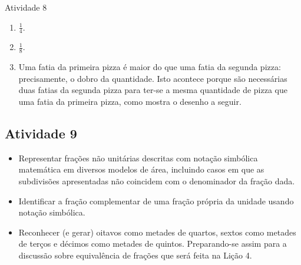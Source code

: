 \begin{multicols}{2}
\begin{resposta*}{Atividade 8}
\begin{enumerate} [\quad a)] %
    \item             $\frac{1}{4}$.
    \item             $\frac{1}{8}$.
    \item       Uma fatia da primeira pizza é maior do que uma fatia da segunda pizza: precisamente, o dobro da quantidade. Isto acontece porque são necessárias duas fatias da segunda pizza para ter-se a mesma quantidade de pizza que uma fatia da primeira pizza, como mostra o desenho a seguir.
\end{enumerate} %
\begin{center}
        \quad \quad
\end{center}
\end{resposta*}





\subsection{Atividade 9}

   \vspace{.1cm}

  \begin{itemize} %
    \item       Representar frações não unitárias descritas com notação simbólica matemática em diversos modelos de área, incluindo casos em que as subdivisões apresentadas não coincidem com o denominador da fração dada.
    \item       Identificar a fração complementar de uma fração própria da unidade usando notação simbólica.
    \item       Reconhecer (e gerar) oitavos como metades de quartos, sextos como metades de terços e décimos como metades de quintos. Preparando-se assim para a discussão sobre equivalência de frações que será feita na Lição 4.
\end{itemize} %



\end{multicols}
